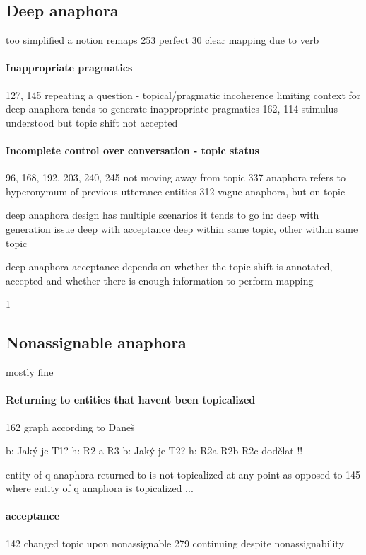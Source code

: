 \subsection{Deep anaphora}
    too simplified a notion
    remaps
    253 perfect
    30 clear mapping due to verb
\paragraph{Inappropriate pragmatics}
    127, 145 repeating a question - topical/pragmatic incoherence
        limiting context for deep anaphora tends to generate inappropriate pragmatics
    162, 114 stimulus understood but topic shift not accepted

\paragraph{Incomplete control over conversation - topic status}
    96, 168, 192, 203, 240, 245 not moving away from topic
    337 anaphora refers to hyperonymum of previous utterance entities
    312 vague anaphora, but on topic

    deep anaphora design has multiple scenarios it tends to go in:
    deep with generation issue
    deep with acceptance
    deep within same topic, other within same topic

    deep anaphora acceptance depends on
    whether the topic shift is annotated, accepted and
    whether there is enough information to perform mapping

1
\subsection{Nonassignable anaphora}
mostly fine

\paragraph{Returning to entities that havent been topicalized}
    162 graph according to Daneš

    b: Jaký je T1?
    h: R2 a R3
    b: Jaký je T2?
    h: R2a R2b R2c
    dodělat !!

    entity of q anaphora returned to is not topicalized at any point
    as opposed to 145 where entity of q anaphora is topicalized
    ...

\paragraph{acceptance}
    142 changed topic upon nonassignable
    279 continuing despite nonassignability

